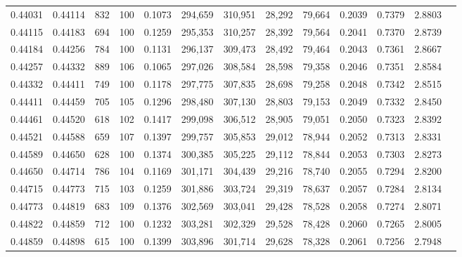 \begin{tabular}{rrrrrrrrrrrrr}
0.44031 & 0.44114 &   832 & 100 &                                     0.1073 & 294,659 & 310,951 &  28,292 &  79,664 & 0.2039 & 0.7379 & 2.8803 \\
0.44115 & 0.44183 &   694 & 100 &                                     0.1259 & 295,353 & 310,257 &  28,392 &  79,564 & 0.2041 & 0.7370 & 2.8739 \\
0.44184 & 0.44256 &   784 & 100 &                                     0.1131 & 296,137 & 309,473 &  28,492 &  79,464 & 0.2043 & 0.7361 & 2.8667 \\
0.44257 & 0.44332 &   889 & 106 &                                     0.1065 & 297,026 & 308,584 &  28,598 &  79,358 & 0.2046 & 0.7351 & 2.8584 \\
0.44332 & 0.44411 &   749 & 100 &                                     0.1178 & 297,775 & 307,835 &  28,698 &  79,258 & 0.2048 & 0.7342 & 2.8515 \\
0.44411 & 0.44459 &   705 & 105 &                                     0.1296 & 298,480 & 307,130 &  28,803 &  79,153 & 0.2049 & 0.7332 & 2.8450 \\
0.44461 & 0.44520 &   618 & 102 &                                     0.1417 & 299,098 & 306,512 &  28,905 &  79,051 & 0.2050 & 0.7323 & 2.8392 \\
0.44521 & 0.44588 &   659 & 107 &                                     0.1397 & 299,757 & 305,853 &  29,012 &  78,944 & 0.2052 & 0.7313 & 2.8331 \\
0.44589 & 0.44650 &   628 & 100 &                                     0.1374 & 300,385 & 305,225 &  29,112 &  78,844 & 0.2053 & 0.7303 & 2.8273 \\
0.44650 & 0.44714 &   786 & 104 &                                     0.1169 & 301,171 & 304,439 &  29,216 &  78,740 & 0.2055 & 0.7294 & 2.8200 \\
0.44715 & 0.44773 &   715 & 103 &                                     0.1259 & 301,886 & 303,724 &  29,319 &  78,637 & 0.2057 & 0.7284 & 2.8134 \\
0.44773 & 0.44819 &   683 & 109 &                                     0.1376 & 302,569 & 303,041 &  29,428 &  78,528 & 0.2058 & 0.7274 & 2.8071 \\
0.44822 & 0.44859 &   712 & 100 &                                     0.1232 & 303,281 & 302,329 &  29,528 &  78,428 & 0.2060 & 0.7265 & 2.8005 \\
0.44859 & 0.44898 &   615 & 100 &                                     0.1399 & 303,896 & 301,714 &  29,628 &  78,328 & 0.2061 & 0.7256 & 2.7948 \\

\end{tabular}
